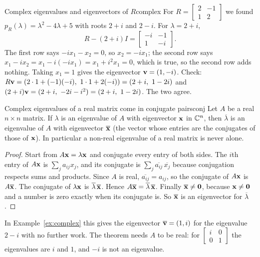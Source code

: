 \documentclass[11pt]{article}
\begin{document}
\begin{exmp}{Complex eigenvalues and eigenvectors of $R$}{complex}
For $R=\begin{bmatrix}2&-1\\1&2\end{bmatrix}$ we found $p_R(\lambda)=\lambda^2-4\lambda+5$ with roots $2+i$ and $2-i$. For $\lambda=2+i$,
\[
R-(2+i)I=\begin{bmatrix}-i&-1\\1&-i\end{bmatrix}.
\]
The first row says $-ix_1-x_2=0$, so $x_2=-ix_1$; the second row says $x_1-ix_2=x_1-i(-ix_1)=x_1+i^2x_1=0$, which is true, so the second row adds nothing. Taking $x_1=1$ gives the eigenvector $\mathbf{v}=(1,-i)$. Check: $R\bv{v}=(2\cdot1+(-1)(-i),\ 1\cdot1+2(-i))=(2+i,\ 1-2i)$ and $(2+i)\mathbf{v}=(2+i,\ -2i-i^2)=(2+i,\ 1-2i)$. The two agree.
\end{exmp}

\begin{thm}{Complex eigenvalues of a real matrix come in conjugate pairs}{conj}
Let $A$ be a real $n\times n$ matrix. If $\lambda$ is an eigenvalue of $A$ with eigenvector $\mathbf{x}$ in $\mathbb{C}^n$, then $\overline{\lambda}$ is an eigenvalue of $A$ with eigenvector $\overline{\mathbf{x}}$ (the vector whose entries are the conjugates of those of $\mathbf{x}$). In particular a non-real eigenvalue of a real matrix is never alone.
\end{thm}

\begin{proof}
Start from $A\mathbf{x}=\lambda\mathbf{x}$ and conjugate every entry of both sides. The $i$th entry of $A\mathbf{x}$ is $\sum_j a_{ij}x_j$, and its conjugate is $\sum_j\overline{a_{ij}}\,\overline{x_j}$ because conjugation respects sums and products. Since $A$ is real, $\overline{a_{ij}}=a_{ij}$, so the conjugate of $A\mathbf{x}$ is $A\overline{\mathbf{x}}$. The conjugate of $\lambda\mathbf{x}$ is $\overline{\lambda}\,\overline{\mathbf{x}}$. Hence $A\overline{\mathbf{x}}=\overline{\lambda}\,\overline{\mathbf{x}}$. Finally $\overline{\mathbf{x}}\neq\mathbf{0}$, because $\mathbf{x}\neq\mathbf{0}$ and a number is zero exactly when its conjugate is. So $\overline{\mathbf{x}}$ is an eigenvector for $\overline{\lambda}$.
\end{proof}

In Example~\ref{ex:complex} this gives the eigenvector $\overline{\mathbf{v}}=(1,i)$ for the eigenvalue $2-i$ with no further work. The theorem needs $A$ to be real: for $\begin{bmatrix}i&0\\0&1\end{bmatrix}$ the eigenvalues are $i$ and $1$, and $-i$ is not an eigenvalue.
\end{document}
